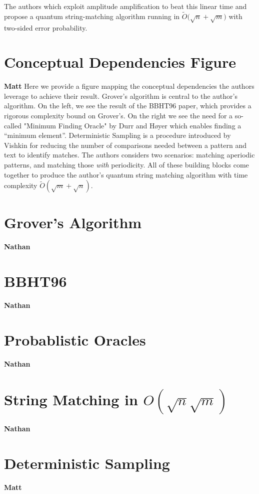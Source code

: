 \documentclass[11pt]{article}
\begin{document}
The authors which exploit amplitude amplification to beat this linear time and propose a quantum string-matching algorithm running in \(\widetilde{O}\bigl(\sqrt{n} + \sqrt{m}\bigr)\) with two-sided error probability.

\section*{Conceptual Dependencies Figure}
\textbf{Matt} \linebreak
Here we provide a figure mapping the conceptual dependencies the authors leverage to achieve their result.
Grover's algorithm is central to the author's algorithm. On the left, we see the result of the BBHT96 paper, which provides a rigorous complexity bound on Grover's. On the right we see the need for a so-called "Minimum Finding Oracle" by Durr and Høyer which enables finding a ``minimum element''. Deterministic Sampling is a procedure introduced by Vishkin for reducing the number of comparisons needed between a pattern and text to identify matches. The authors considers two scenarios: matching aperiodic patterns, and matching those \textit{with} periodicity.
All of these building blocks come together to produce the author's quantum string matching algorithm with time complexity \(\widetilde{O}(\sqrt{m} + \sqrt{n})\).

\section*{Grover's Algorithm}
\textbf{Nathan} \linebreak
\section*{BBHT96}
\textbf{Nathan} \linebreak
\section*{Probablistic Oracles}
\textbf{Nathan} \linebreak
\section*{String Matching in \(O(\sqrt{n} \sqrt{m})\)}
\textbf{Nathan} \linebreak

\section*{Deterministic Sampling}
\textbf{Matt}\linebreak
\end{document}
